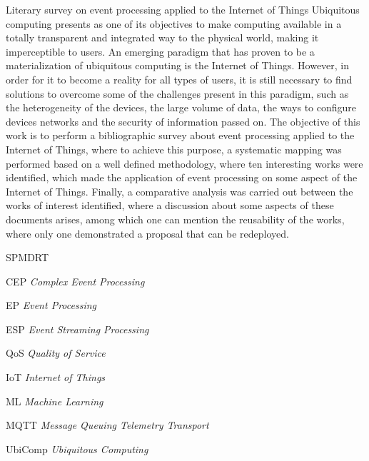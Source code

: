 \documentclass[ti,table]{texufpel} %
\begin{document}
\begin{englishabstract}%
{Literary survey on event processing applied to the Internet of Things} 
Ubiquitous computing presents as one of its objectives to make computing available in a totally transparent and integrated way to the physical world, making it imperceptible to users. An emerging paradigm that has proven to be a materialization of ubiquitous computing is the Internet of Things. However, in order for it to become a reality for all types of users, it is still necessary to find solutions to overcome some of the challenges present in this paradigm, such as the heterogeneity of the devices, the large volume of data, the ways to configure devices networks and the security of information passed on. The objective of this work is to perform a bibliographic survey about event processing applied to the Internet of Things, where to achieve this purpose, a systematic mapping was performed based on a well defined methodology, where ten interesting works were identified, which made the application of event processing on some aspect of the Internet of Things. Finally, a comparative analysis was carried out between the works of interest identified, where a discussion about some aspects of these documents arises, among which one can mention the reusability of the works, where only one demonstrated a proposal that can be redeployed.

\end{englishabstract} 

  


\listoffigures 

  



  


\begin{listofabbrv}{SPMDRT} 

    \item[CEP] \textit{Complex Event Processing}   
    
    \item[EP] \textit{Event Processing} 
    
    \item[ESP] \textit{Event Streaming Processing} 
    
    \item[QoS] \textit{Quality of Service}
    
    \item[IoT] \textit{Internet of Things} 
    
    \item[ML] \textit{Machine Learning} 
    
    \item[MQTT] \textit{Message Queuing Telemetry Transport} 

    \item[UbiComp] \textit{Ubiquitous Computing} 
         

\end{listofabbrv} 
\end{document}
